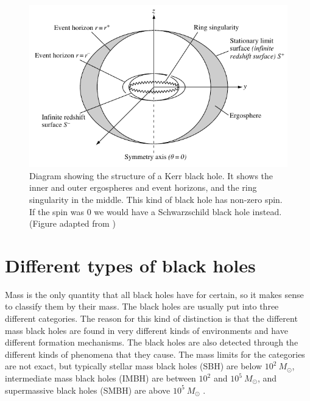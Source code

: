 \documentclass[english, oneside]{HYgradu}
\begin{document}
\begin{figure}
\centering
\includegraphics[width=\textwidth]{../images/kerrhole.pdf}
\caption{Diagram showing the structure of a Kerr black hole. It shows the inner and outer ergospheres and event horizons, and the ring singularity in the middle. This kind of black hole has non-zero spin. If the spin was 0 we would have a Schwarzschild black hole instead.
(Figure adapted from \citealt{grintro})}
\label{fig:KerrHole}
\end{figure}




\newpage
\section{Different types of black holes}

Mass is the only quantity that all black holes have for certain, so it makes sense to classify them by their mass. The black holes are usually put into three different categories. The reason for this kind of distinction is that the different mass black holes are found in very different kinds of environments and have different formation mechanisms. The black holes are also detected through the different kinds of phenomena that they cause.
The mass limits for the categories are not exact, but typically stellar mass black holes (SBH) are below $10^2 \ M_\odot$, intermediate mass black holes (IMBH) are between $10^2$ and $10^5 \ M_\odot$, and supermassive black holes (SMBH) are above $10^5 \ M_\odot$ \citep{bhphysics}.
\end{document}
